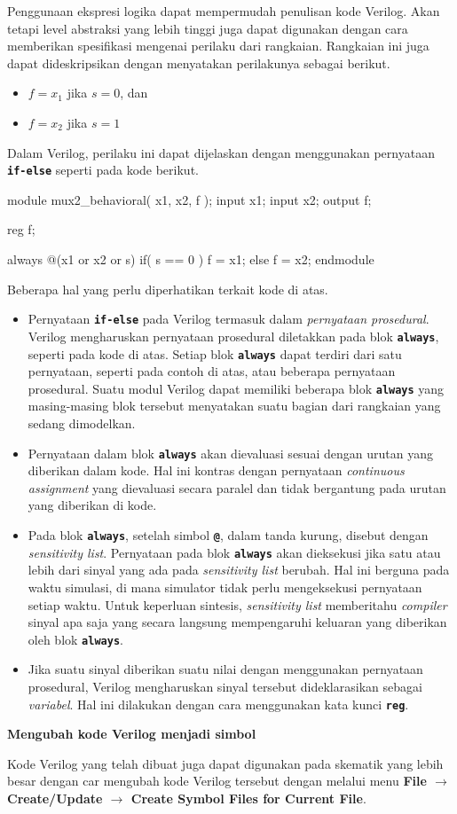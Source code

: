 Penggunaan ekspresi logika dapat mempermudah penulisan kode Verilog.
Akan tetapi level abstraksi yang lebih tinggi juga dapat digunakan
dengan cara memberikan spesifikasi mengenai perilaku dari rangkaian.
Rangkaian ini juga dapat dideskripsikan dengan menyatakan perilakunya
sebagai berikut.
\begin{itemize}
\item $f = x_1$ jika $s = 0$, dan
\item $f = x_2$ jika $s = 1$
\end{itemize}

Dalam Verilog, perilaku ini dapat dijelaskan dengan menggunakan
pernyataan {\tt \bf if-else} seperti pada kode berikut.
{
\begin{verilogcode}
module mux2_behavioral( x1, x2, f );
  input x1;
  input x2;
  output f;

  reg f;

  always @(x1 or x2 or s)
    if( s == 0 )
      f = x1;
    else
      f = x2;
endmodule
\end{verilogcode}
}

Beberapa hal yang perlu diperhatikan terkait kode di atas.

\begin{itemize}
\item Pernyataan {\tt\textbf{if-else}} pada Verilog termasuk dalam
\textit{pernyataan prosedural}.
Verilog mengharuskan pernyataan prosedural diletakkan pada blok
{\tt\textbf{always}},
seperti pada kode di atas. Setiap blok {\tt\textbf{always}} dapat terdiri dari satu
pernyataan, seperti pada contoh di atas, atau beberapa pernyataan prosedural.
Suatu modul Verilog dapat memiliki beberapa
blok {\tt\textbf{always}} yang masing-masing blok tersebut menyatakan suatu bagian
dari rangkaian yang sedang dimodelkan.
\item Pernyataan dalam blok {\tt\textbf{always}} akan dievaluasi sesuai dengan urutan yang
diberikan dalam kode. Hal ini kontras dengan pernyataan
\textit{continuous assignment}
yang dievaluasi secara paralel dan tidak bergantung pada urutan yang diberikan
di kode.
\item Pada blok {\tt\textbf{always}}, setelah simbol {\tt \textbf{@}},
dalam tanda kurung, disebut
dengan \textit{sensitivity list}. Pernyataan pada blok {\tt\textbf{always}} akan dieksekusi
jika satu atau lebih dari sinyal yang ada pada \textit{sensitivity list} berubah.
Hal ini berguna pada waktu simulasi, di mana simulator tidak perlu mengeksekusi
pernyataan setiap waktu.
Untuk keperluan sintesis, \textit{sensitivity list} memberitahu
\textit{compiler} sinyal
apa saja yang secara langsung mempengaruhi keluaran yang diberikan oleh blok
{\tt\textbf{always}}.
\item Jika suatu sinyal diberikan suatu nilai dengan menggunakan pernyataan
prosedural, Verilog mengharuskan sinyal tersebut dideklarasikan sebagai
\textit{variabel}. Hal ini dilakukan dengan cara menggunakan kata kunci
{\tt\textbf{reg}}.
\end{itemize}

\textbf{Mengubah kode Verilog menjadi simbol}

Kode Verilog yang telah dibuat juga dapat digunakan pada skematik yang
lebih besar dengan car mengubah kode Verilog tersebut dengan melalui
menu \textbf{File $\rightarrow$ Create/Update $\rightarrow$ Create Symbol Files
for Current File}.



